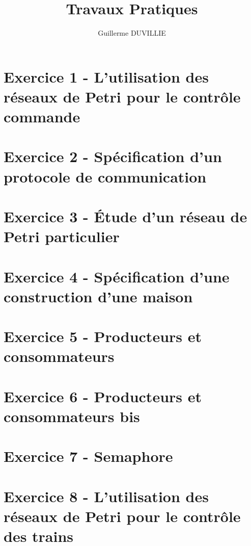 \documentclass[a4paper,11pt]{article}
\author{}
\title{}
\title{Travaux Pratiques}
\author{Guillerme DUVILLIE}
\begin{document}
\maketitle

\section{Exercice 1 - L'utilisation des réseaux de Petri pour le contrôle commande}



\section{Exercice 2 - Spécification d'un protocole de communication}

\section{Exercice 3 - Étude d'un réseau de Petri particulier}

\section{Exercice 4 - Spécification d'une construction d'une maison}



\section{Exercice 5 - Producteurs et consommateurs}



\section{Exercice 6 - Producteurs et consommateurs bis}

\section{Exercice 7 - Semaphore}

\section{Exercice 8 - L'utilisation des réseaux de Petri pour le contrôle des trains}


\end{document}
